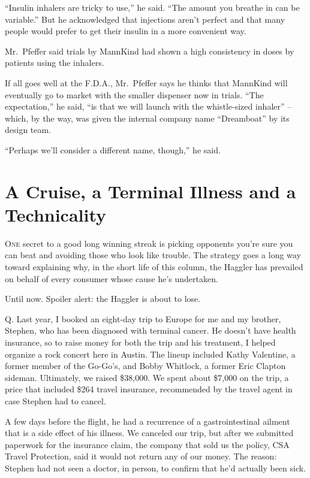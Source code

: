 ﻿\documentclass[12pt]{article}
\begin{document}
``Insulin inhalers are tricky to use,'' he said. ``The amount you breathe in can be variable.'' But
he acknowledged that injections aren't perfect and that many people would prefer to get their
insulin in a more convenient way.

Mr.~Pfeffer said trials by MannKind had shown a high consistency in doses by patients using the
inhalers.

If all goes well at the F.D.A., Mr.~Pfeffer says he thinks that MannKind will eventually go to
market with the smaller dispenser now in trials. ``The expectation,'' he said, ``is that we will
launch with the whistle-sized inhaler'' -- which, by the way, was given the internal company name
``Dreamboat'' by its design team.

``Perhaps we'll consider a different name, though,'' he said.

\section{A Cruise, a Terminal Illness and a Technicality}

\lettrine{O}{ne} secret to a good long winning streak is picking opponents
you're sure you can beat and avoiding those who look like trouble. The strategy goes a long way
toward explaining why, in the short life of this column, the Haggler has prevailed on behalf of
every consumer whose cause he's undertaken.

Until now. Spoiler alert: the Haggler is about to lose.

Q. Last year, I booked an eight-day trip to Europe for me and my brother, Stephen, who has been
diagnosed with terminal cancer. He doesn't have health insurance, so to raise money for both the
trip and his treatment, I helped organize a rock concert here in Austin. The lineup included Kathy
Valentine, a former member of the Go-Go's, and Bobby Whitlock, a former Eric Clapton sideman.
Ultimately, we raised \$38,000. We spent about \$7,000 on the trip, a price that included \$264
travel insurance, recommended by the travel agent in case Stephen had to cancel.

A few days before the flight, he had a recurrence of a gastrointestinal ailment that is a side
effect of his illness. We canceled our trip, but after we submitted paperwork for the insurance
claim, the company that sold us the policy, CSA Travel Protection, said it would not return any of
our money. The reason: Stephen had not seen a doctor, in person, to confirm that he'd actually been
sick.
\end{document}
